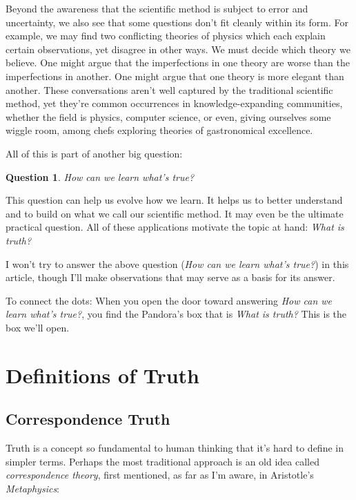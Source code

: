 \documentclass[11pt, oneside]{article}
\newtheorem*{question*}{Question}
\theoremstyle{argtstyle}
\begin{document}
Beyond the awareness that the scientific method is subject to
error and uncertainty, we also
see that some questions don't fit cleanly within its form.
For example, we may find two conflicting theories of physics which
each explain certain observations, yet disagree in other ways. We must decide
which theory we believe. One might argue that the imperfections in one theory are worse
than the imperfections in another. One might argue that one theory is more elegant than
another.
These conversations aren't well captured by the traditional
scientific method, yet
they're common occurrences in knowledge-expanding communities,
whether the field is physics, computer science, or even, giving
ourselves some wiggle room, among chefs exploring theories of gastronomical
excellence.

All of this is part of another big question:

\begin{question*}\label{q2}
    How can we learn what's true?
\end{question*}

This question can help us evolve how we learn.
It helps us to better understand and to build on what we call our
scientific method.
It may even
be the ultimate practical question.
All of these applications motivate
the topic at hand: {\em What is truth?}

I won't try to answer the above question
({\em How can we learn what's true?}) in this article,
though I'll make observations that may serve
as a basis for its answer.

To connect the dots: When you open the door toward answering {\em How can we
learn what's true?}, you find the
Pandora's box that is {\em What is truth?} This is the box we'll open.

\section{Definitions of Truth}\label{s2}

\subsection{Correspondence Truth}

Truth is a concept so fundamental to human thinking that it's hard to define
in simpler terms.
Perhaps the most traditional approach is an old idea called
{\em correspondence theory}, first mentioned, as far
as I'm aware,
in Aristotle's {\em Metaphysics}\/:
\end{document}
